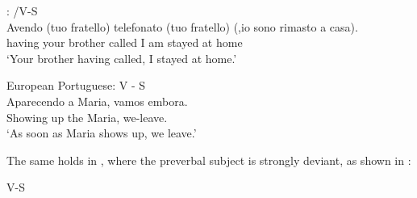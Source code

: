 \documentclass[output=paper]{LSP/langsci}
\begin{document}
\ea%
\label{ex:anagnost:34}
: /V-S \\
\gll Avendo (tuo fratello) telefonato (tuo fratello) (,io sono rimasto a casa).\\
having your brother called I am stayed at home\\
\glt ‘Your brother having called, I stayed at home.’
\z

\ea%
\label{ex:anagnost:35}
European Portuguese: V - S\\
\gll Aparecendo a Maria, vamos embora.\\
Showing up the Maria, we-leave.\\
\glt ‘As soon as Maria shows up, we leave.’
\z

The same holds in , where the preverbal subject is strongly deviant, as shown in :

\ea%
\label{ex:anagnost:36}
 V-S\\
\z \z
\end{document}
